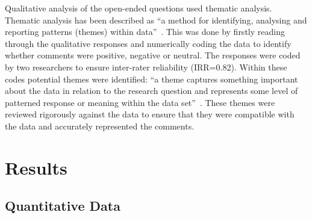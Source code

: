 \documentclass[conference]{IEEEtran}
\begin{document}

Qualitative analysis of the open-ended questions used thematic
analysis. Thematic analysis has been described as ``a method for
identifying, analysing and reporting patterns (themes) within
data''~\cite{braun+clarke:2006}. This was done by firstly reading
through the qualitative responses and numerically coding the data to
identify whether comments were positive, negative or neutral. The
responses were coded by two researchers to ensure inter-rater
reliability (IRR=0.82). Within these codes potential themes were
identified: ``a theme captures something important about the data in
relation to the research question and represents some level of
patterned response or meaning within the data
set''~\cite[p.82]{braun+clarke:2006}. These themes were reviewed
rigorously against the data to ensure that they were compatible with
the data and accurately represented the comments.


\section{Results}\label{results}

\subsection{Quantitative Data}\label{quantdata}

\end{document}

